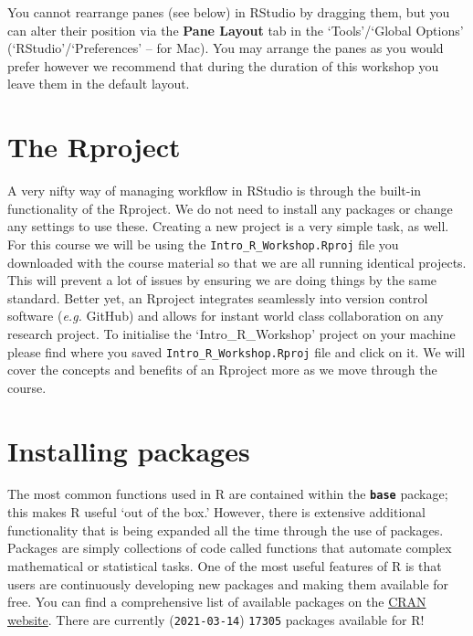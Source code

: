 \documentclass[
]{book}
\begin{document}
You cannot rearrange panes (see below) in RStudio by dragging them, but you can alter their position via the \textbf{Pane Layout} tab in the `Tools'/`Global Options' (`RStudio'/`Preferences' -- for Mac). You may arrange the panes as you would prefer however we recommend that during the duration of this workshop you leave them in the default layout.

\hypertarget{the-rproject}{%
\section{The Rproject}\label{the-rproject}}

A very nifty way of managing workflow in RStudio is through the built-in functionality of the Rproject. We do not need to install any packages or change any settings to use these. Creating a new project is a very simple task, as well. For this course we will be using the \texttt{Intro\_R\_Workshop.Rproj} file you downloaded with the course material so that we are all running identical projects. This will prevent a lot of issues by ensuring we are doing things by the same standard. Better yet, an Rproject integrates seamlessly into version control software (\emph{e.g.} GitHub) and allows for instant world class collaboration on any research project. To initialise the `Intro\_R\_Workshop' project on your machine please find where you saved \texttt{Intro\_R\_Workshop.Rproj} file and click on it. We will cover the concepts and benefits of an Rproject more as we move through the course.

\hypertarget{installing-packages}{%
\section{Installing packages}\label{installing-packages}}

The most common functions used in R are contained within the \textbf{\texttt{base}} package; this makes R useful `out of the box.' However, there is extensive additional functionality that is being expanded all the time through the use of packages. Packages are simply collections of code called functions that automate complex mathematical or statistical tasks. One of the most useful features of R is that users are continuously developing new packages and making them available for free. You can find a comprehensive list of available packages on the \href{https://cran.r-project.org/web/packages/}{CRAN website}. There are currently (\texttt{2021-03-14}) \texttt{17305} packages available for R!
\end{document}
